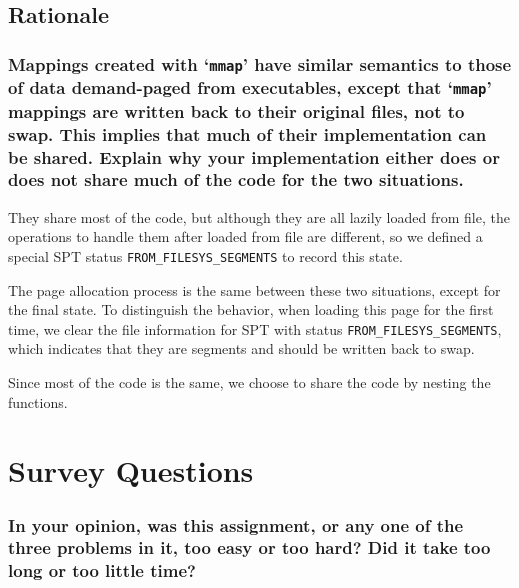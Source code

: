 \documentclass[sigconf, nonacm, balance=false, urlbreakonhyphens=true]{acmart}
\begin{document}
        \subsection{Rationale}

            \subsubsection{Mappings created with `\texttt{mmap}' have similar semantics to those of data demand-paged from executables, except that `\texttt{mmap}' mappings are written back to their original files, not to swap.  This implies that much of their implementation can be shared.  Explain why your implementation either does or does not share much of the code for the two situations. }

                They share most of the code, but although they are all lazily loaded from file, the operations to handle them after loaded from file are different, so we defined a special SPT status \texttt{FROM\_FILESYS\_SEGMENTS} to record this state. 
                
                The page allocation process is the same between these two situations, except for the final state. To distinguish the behavior, when loading this page for the first time, we clear the file information for SPT with status \texttt{FROM\_FILESYS\_SEGMENTS}, which indicates that they are segments and should be written back to swap. 

                Since most of the code is the same, we choose to share the code by nesting the functions. 

    \section{Survey Questions}


        \subsubsection*{In your opinion, was this assignment, or any one of the three problems in it, too easy or too hard? Did it take too long or too little time? }
\end{document}
